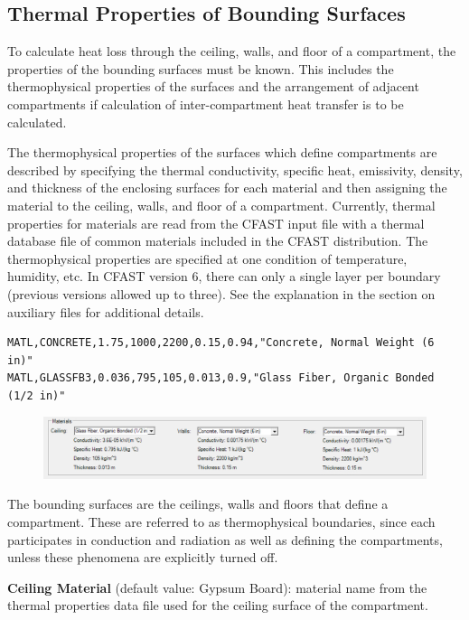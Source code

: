 \subsection{Thermal Properties of Bounding Surfaces}

To calculate heat loss through the ceiling, walls, and floor of a compartment, the properties of the bounding surfaces must be known. This includes the thermophysical properties of the surfaces and the arrangement of adjacent compartments if calculation of inter-compartment heat transfer is to be calculated.

The thermophysical properties of the surfaces which define compartments are described by specifying the thermal conductivity, specific heat, emissivity, density, and thickness of the enclosing surfaces for each material and then assigning the material to the ceiling, walls, and floor of a compartment.  Currently, thermal properties for materials are read from the CFAST input file with a thermal database file of common materials included in the CFAST distribution.  The thermophysical properties are specified at one condition of temperature, humidity, etc.  In CFAST version 6, there can only a single layer per boundary (previous versions allowed up to three). See the explanation in the section on auxiliary files for additional details.

\begin{lstlisting}
MATL,CONCRETE,1.75,1000,2200,0.15,0.94,"Concrete, Normal Weight (6 in)"
MATL,GLASSFB3,0.036,795,105,0.013,0.9,"Glass Fiber, Organic Bonded (1/2 in)"
\end{lstlisting}

\begin{figure}[h!]
\includegraphics[width=6.5in]{FIGURES/Input_File/Compartment_Materials}
\end{figure}

The bounding surfaces are the ceilings, walls and floors that define a compartment. These are referred to as thermophysical boundaries, since each participates in conduction and radiation as well as defining the compartments, unless these phenomena are explicitly turned off. 

\textbf{Ceiling Material} (default value: Gypsum Board): material name from the thermal properties data file used for the ceiling surface of the compartment. 

